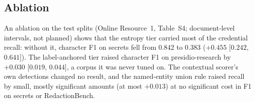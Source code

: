 \subsection{Ablation}\label{sec:ablation}
An ablation on the test splits (Online Resource~1, Table~S4; document-level intervals, not planned) shows that the entropy tier carried most of the credential recall: without it, character F1 on secrets fell from 0.842 to 0.383 ($+0.455$ [$0.242$, $0.641$]). The label-anchored tier raised character F1 on presidio-research by $+0.030$ [$0.019$, $0.044$], a corpus it was never tuned on. The contextual scorer's own detections changed no result, and the named-entity union rule raised recall by small, mostly significant amounts (at most $+0.013$) at no significant cost in F1 on secrets or RedactionBench.
